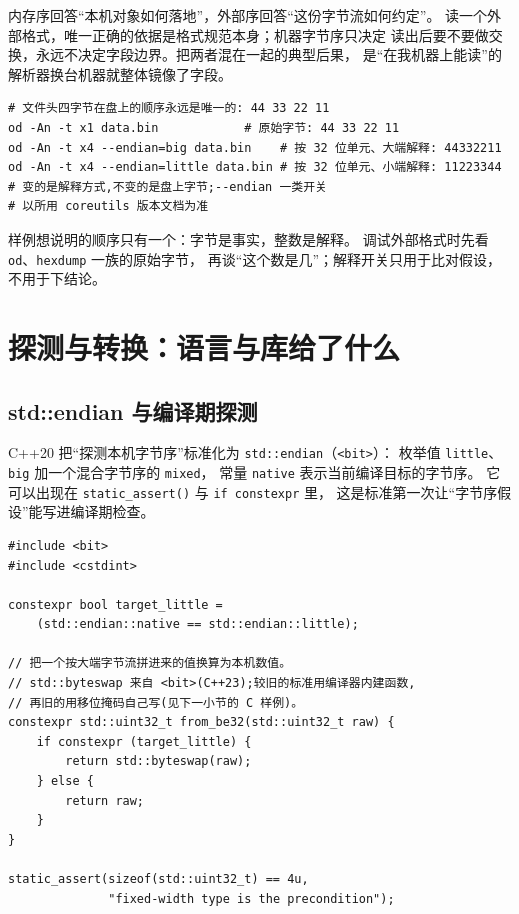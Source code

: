 \documentclass[12pt,a4paper,fontset=fandol]{ctexbook}
\newcommand{\cpp}[1]{C++#1}
\newcommand{\Fn}[1]{\texttt{#1()}}
\newcommand{\Tp}[1]{\texttt{#1}}
\newcommand{\Tool}[1]{\texttt{#1}}
\begin{document}
\begin{guideline}[title={“我的机器是小端”回答不了“这个文件怎么读”}]
内存序回答“本机对象如何落地”，外部序回答“这份字节流如何约定”。
读一个外部格式，唯一正确的依据是格式规范本身；机器字节序只决定
读出后要不要做交换，永远不决定字段边界。把两者混在一起的典型后果，
是“在我机器上能读”的解析器换台机器就整体镜像了字段。
\end{guideline}

\begin{lstlisting}[style=outstyle, caption={同一份字节的两种解释（示意，非实测输出）}]
# 文件头四字节在盘上的顺序永远是唯一的: 44 33 22 11
od -An -t x1 data.bin            # 原始字节: 44 33 22 11
od -An -t x4 --endian=big data.bin    # 按 32 位单元、大端解释: 44332211
od -An -t x4 --endian=little data.bin # 按 32 位单元、小端解释: 11223344
# 变的是解释方式,不变的是盘上字节;--endian 一类开关
# 以所用 coreutils 版本文档为准
\end{lstlisting}

样例想说明的顺序只有一个：字节是事实，整数是解释。
调试外部格式时先看 \Tool{od}、\Tool{hexdump} 一族的原始字节，
再谈“这个数是几”；解释开关只用于比对假设，不用于下结论。

\section{探测与转换：语言与库给了什么}\label{sec:cl12-probe}

\subsection{std::endian 与编译期探测}\label{sec:cl12-std-endian}

\cpp{20} 把“探测本机字节序”标准化为 \Tp{std::endian}（\Tp{<bit>}）：
枚举值 \Tp{little}、\Tp{big} 加一个混合字节序的 \Tp{mixed}，
常量 \Tp{native} 表示当前编译目标的字节序。
它可以出现在 \Fn{static\_assert} 与 \Tp{if constexpr} 里，
这是标准第一次让“字节序假设”能写进编译期检查。

\begin{lstlisting}[style=cppstyle, caption={编译期字节序探测与交换（std::byteswap 为 C++23 设施）}]
#include <bit>
#include <cstdint>

constexpr bool target_little =
    (std::endian::native == std::endian::little);

// 把一个按大端字节流拼进来的值换算为本机数值。
// std::byteswap 来自 <bit>(C++23);较旧的标准用编译器内建函数,
// 再旧的用移位掩码自己写(见下一小节的 C 样例)。
constexpr std::uint32_t from_be32(std::uint32_t raw) {
    if constexpr (target_little) {
        return std::byteswap(raw);
    } else {
        return raw;
    }
}

static_assert(sizeof(std::uint32_t) == 4u,
              "fixed-width type is the precondition");
\end{lstlisting}
\end{document}
